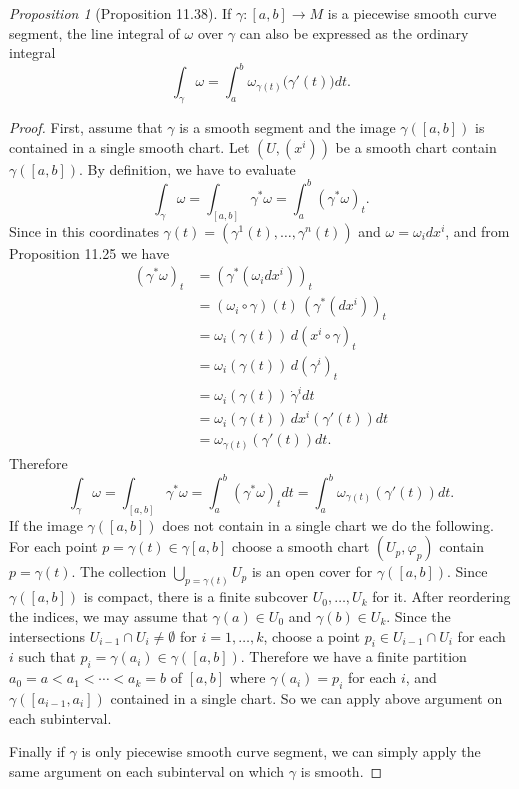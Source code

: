 \documentclass[a4paper]{article}
\theoremstyle{remark}
\newtheorem{prop}{Proposition}
\begin{document}
\begin{prop}[Proposition 11.38]
If $\gamma : [a,b] \to M$ is a piecewise smooth curve segment, the line integral of $\omega$ over $\gamma$ can also be expressed as the ordinary integral
$$
\int_{\gamma} \omega = \int_{a}^{b} \omega_{\gamma(t)} \big( \gamma'(t) \big) dt.
$$
\end{prop}
\begin{proof}
First, assume that $\gamma$ is a smooth segment and the image $\gamma([a,b])$ is contained in a single smooth chart. Let $(U,(x^i))$ be a smooth chart contain $\gamma([a,b])$. By definition, we have to evaluate
$$
\int_{\gamma} \omega = \int_{[a,b]} \gamma^*\omega = \int_{a}^{b} (\gamma^*\omega)_t.
$$
Since in this coordinates $\gamma(t) = (\gamma^1(t),\dots,\gamma^n(t))$ and $\omega = \omega_i dx^i$, and from Proposition 11.25 we have
\begin{align*}
(\gamma^*\omega)_t &= (\gamma^*(\omega_i dx^i))_t\\ &= (\omega_i \circ \gamma)(t) \, (\gamma^*(dx^i))_t\\ &= \omega_i(\gamma(t)) \, d(x^i \circ \gamma)_t \\ &= \omega_i(\gamma(t))\, d(\gamma^i)_t  \\
&= \omega_i(\gamma(t)) \, \dot{\gamma}^i dt \\
&= \omega_i(\gamma(t)) \, dx^i (\gamma'(t)) dt\\
&= \omega_{\gamma(t)} (\gamma'(t)) dt.
\end{align*}
Therefore 
$$
\int_{\gamma} \omega = \int_{[a,b]} \gamma^*\omega = \int_{a}^{b} (\gamma^*\omega)_t dt = \int_a^b \omega_{\gamma(t)} (\gamma'(t)) dt.
$$
If the image $\gamma([a,b])$ does not contain in a single chart we do the following. For each point $p=\gamma(t) \in \gamma[a,b]$ choose a smooth chart $(U_p,\varphi_p)$ contain $p=\gamma(t)$. The collection $\bigcup_{p=\gamma(t)} U_p$ is an open cover for $\gamma([a,b])$. Since $\gamma([a,b])$ is compact, there is a finite subcover $U_{0},\dots,U_{k}$ for it. After reordering the indices, we may assume that $\gamma(a) \in U_0$ and $\gamma(b)\in U_k$. Since the intersections $U_{i-1} \cap U_i \neq \emptyset$ for $i=1,\dots,k$, choose a point $p_i \in U_{i-1}\cap U_i$ for each $i$ such that $p_i=\gamma(a_i) \in \gamma([a,b])$. Therefore we have a finite partition $a_0=a < a_1 <\cdots <a_k=b$ of $[a,b]$ where $\gamma(a_i) = p_i$ for each $i$, and $\gamma([a_{i-1},a_i])$ contained in a single chart. So we can apply above argument on each subinterval.

Finally if $\gamma$ is only piecewise smooth curve segment, we can simply apply the same argument on each subinterval on which $\gamma$ is smooth.    
\end{proof}
\end{document}

